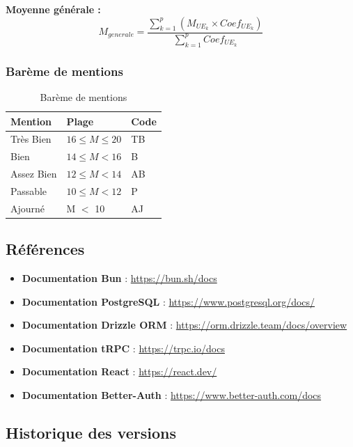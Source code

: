 \textbf{Moyenne générale :}
\begin{equation}
M_{generale} = \frac{\sum_{k=1}^{p} (M_{UE_k} \times Coef_{UE_k})}{\sum_{k=1}^{p} Coef_{UE_k}}
\end{equation}

\subsubsection{Barème de mentions}

\begin{table}[h]
\centering
\begin{tabular}{|l|l|l|}
\hline
\textbf{Mention} & \textbf{Plage} & \textbf{Code} \\
\hline
Très Bien & $16 \leq M \leq 20$ & TB \\
Bien & $14 \leq M < 16$ & B \\
Assez Bien & $12 \leq M < 14$ & AB \\
Passable & $10 \leq M < 12$ & P \\
Ajourné & M $<$ 10 & AJ \\
\hline
\end{tabular}
\caption{Barème de mentions}
\end{table}

\subsection{Références}

\begin{itemize}[leftmargin=*]
    \item \textbf{Documentation Bun} : \url{https://bun.sh/docs}
    \item \textbf{Documentation PostgreSQL} : \url{https://www.postgresql.org/docs/}
    \item \textbf{Documentation Drizzle ORM} : \url{https://orm.drizzle.team/docs/overview}
    \item \textbf{Documentation tRPC} : \url{https://trpc.io/docs}
    \item \textbf{Documentation React} : \url{https://react.dev/}
    \item \textbf{Documentation Better-Auth} : \url{https://www.better-auth.com/docs}
\end{itemize}

\subsection{Historique des versions}

